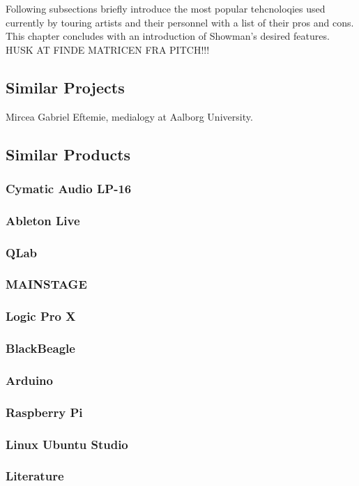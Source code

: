 Following subsections briefly introduce the most popular tehcnoloqies used currently by touring artists and their personnel with a list of their pros and cons. This chapter concludes with an introduction of Showman's desired features. \\

HUSK AT FINDE MATRICEN FRA PITCH!!!

\subsection{Similar Projects}
Mircea Gabriel Eftemie, medialogy at Aalborg University.

\subsection{Similar Products}


\subsubsection{Cymatic Audio LP-16}


\subsubsection{Ableton Live}


\subsubsection{QLab}


\subsubsection{MAINSTAGE}


\subsubsection{Logic Pro X}


\subsubsection{BlackBeagle}


\subsubsection{Arduino}


\subsubsection{Raspberry Pi}


\subsubsection{Linux Ubuntu Studio}


\subsubsection{Literature}

